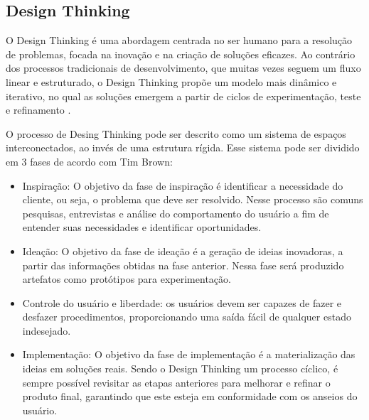 \subsection{Design Thinking}

O Design Thinking é uma abordagem centrada no ser humano para a resolução de problemas, focada na inovação e na criação de soluções eficazes. Ao contrário dos processos tradicionais de desenvolvimento, que muitas vezes seguem um fluxo linear e estruturado, o Design Thinking propõe um modelo mais dinâmico e iterativo, no qual as soluções emergem a partir de ciclos de experimentação, teste e refinamento \cite{browndesignthinking}.

O processo de Desing Thinking pode ser descrito como um sistema de espaços interconectados, ao invés de uma estrutura rígida. Esse sistema pode ser dividido em 3 fases de acordo com Tim Brown:

\begin{itemize}
    \item Inspiração: O objetivo da fase de inspiração é identificar a necessidade do cliente, ou seja, o problema que deve ser resolvido. Nesse processo são comuns pesquisas, entrevistas e análise do comportamento do usuário a fim de entender suas necessidades e identificar oportunidades. 
    \item Ideação: O objetivo da fase de ideação é a geração de ideias inovadoras, a partir das informações obtidas na fase anterior. Nessa fase será produzido artefatos como protótipos para experimentação.
    \item Controle do usuário e liberdade: os usuários devem ser capazes de fazer e desfazer procedimentos, proporcionando uma saída fácil de qualquer estado indesejado.
    \item Implementação: O objetivo da fase de implementação é a materialização das ideias em soluções reais. Sendo o Design Thinking um processo cíclico, é sempre possível revisitar as etapas anteriores para melhorar e refinar o produto final, garantindo que este esteja em conformidade com os anseios do usuário.
\end{itemize}


 